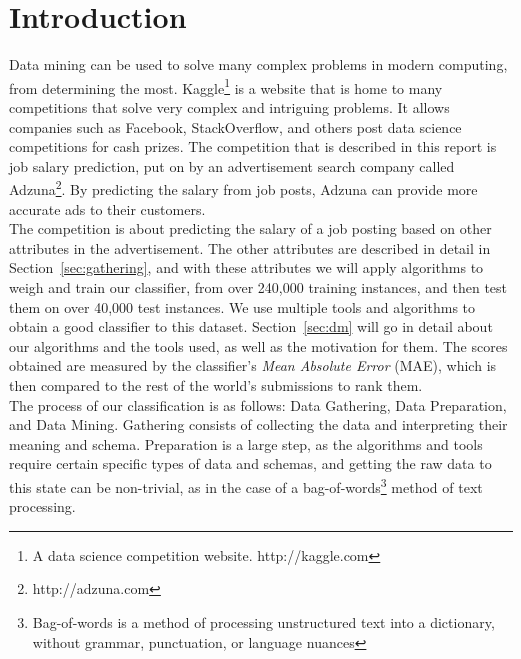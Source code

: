 \section{Introduction}
\label{sec:intro}
Data mining can be used to solve many complex problems in modern computing, from determining the most.  Kaggle\footnote{A data science competition website.  http://kaggle.com} is a website that is home to many competitions that solve very complex and intriguing problems.  It allows companies such as Facebook, StackOverflow, and others post data science competitions for cash prizes.  The competition that is described in this report is job salary prediction, put on by an advertisement search company called Adzuna\footnote{http://adzuna.com}.  By predicting the salary from job posts, Adzuna can provide more accurate ads to their customers.\\

The competition is about predicting the salary of a job posting based on other attributes in the advertisement.  The other attributes are described in detail in Section~\ref{sec:gathering}, and with these attributes we will apply algorithms to weigh and train our classifier, from over 240,000 training instances, and then test them on over 40,000 test instances.   We use multiple tools and algorithms to obtain a good classifier to this dataset.  Section~\ref{sec:dm} will go in detail about our algorithms and the tools used, as well as the motivation for them.  The scores obtained are measured by the classifier's \textit{Mean Absolute Error} (MAE), which is then compared to the rest of the world's submissions to rank them.\\

The process of our classification is as follows: Data Gathering, Data Preparation, and Data Mining.  Gathering consists of collecting the data and interpreting their meaning and schema.  Preparation is a large step, as the algorithms and tools require certain specific types of data and schemas, and getting the raw data to this state can be non-trivial, as in the case of a bag-of-words\footnote{Bag-of-words is a method of processing unstructured text into a dictionary, without grammar, punctuation, or language nuances} method of text processing. 